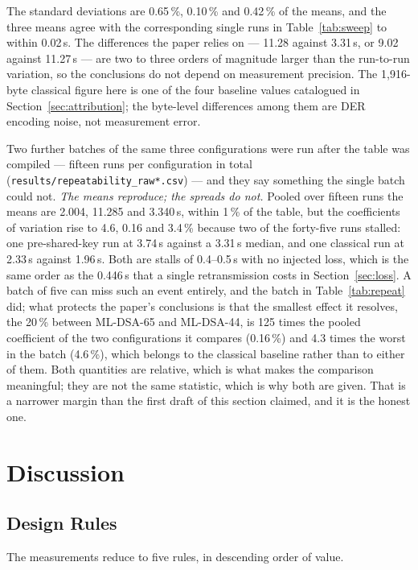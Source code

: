 \documentclass[drones,article,submit,pdftex,moreauthors]{Definitions/mdpi}
\newcommand{\mldsa}{ML-DSA}
\begin{document}
The standard deviations are 0.65\,\%, 0.10\,\% and 0.42\,\% of the
means, and the three means agree with the corresponding single runs in
Table~\ref{tab:sweep} to within 0.02\,s. The differences the paper
relies on --- 11.28 against 3.31\,s, or 9.02 against 11.27\,s --- are
two to three orders of magnitude larger than the run-to-run variation,
so the conclusions do not depend on measurement precision. The
1{,}916-byte classical figure here is one of the four baseline values
catalogued in Section~\ref{sec:attribution}; the byte-level
differences among them are DER encoding noise, not measurement error.

Two further batches of the same three configurations were run after the
table was compiled --- fifteen runs per configuration in total
(\texttt{results/repeatability\_raw*.csv}) --- and they say something
the single batch could not. \emph{The means reproduce; the spreads do
not.} Pooled over fifteen runs the means are 2.004, 11.285 and
3.340\,s, within 1\,\% of the table, but the coefficients of variation
rise to 4.6, 0.16 and 3.4\,\% because two of the forty-five runs
stalled: one pre-shared-key run at 3.74\,s against a 3.31\,s median, and
one classical run at 2.33\,s against 1.96\,s. Both are stalls of 0.4--0.5\,s
with no injected loss, which is the same order as the 0.446\,s that a
single retransmission costs in Section~\ref{sec:loss}. A batch of five
can miss such an event entirely, and the batch in
Table~\ref{tab:repeat} did; what protects the paper's conclusions is
that the smallest effect it resolves, the 20\,\% between \mldsa{}-65 and
\mldsa{}-44, is 125 times the pooled coefficient of the two
configurations it compares (0.16\,\%) and 4.3 times the worst in the
batch (4.6\,\%), which belongs to the classical baseline rather than to
either of them. Both quantities are relative, which is what makes the
comparison meaningful; they are not the same statistic, which is why
both are given. That is a narrower margin than the
first draft of this section claimed, and it is the honest one.

\section{Discussion}
\label{sec:discussion}

\subsection{Design Rules}

The measurements reduce to five rules, in descending order of value.
\end{document}

